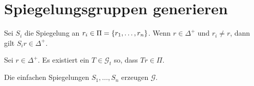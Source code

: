 \documentclass{handout}
\begin{document}
\section{Spiegelungsgruppen generieren}
\begin{satz}
    Sei \( S_i \) die Spiegelung an 
    \( r_i \in \Pi = \{r_1, \ldots, r_n\} \).
    Wenn \( r \in \Delta^+ \) und \( r_i \neq r \), 
    dann gilt \( S_i r \in \Delta^+ \).
\end{satz}
\begin{satz}
    Sei \( r \in \Delta^+ \). Es existiert ein \( T \in 
    \mathscr{G}_t \) so, dass 
    \( Tr \in \Pi \).
\end{satz}

\begin{satz}
    Die einfachen Spiegelungen \( S_1, \ldots, S_n \) 
    erzeugen \( \mathscr{G} \).
\end{satz}


\makeliteratur{}
\end{document}
